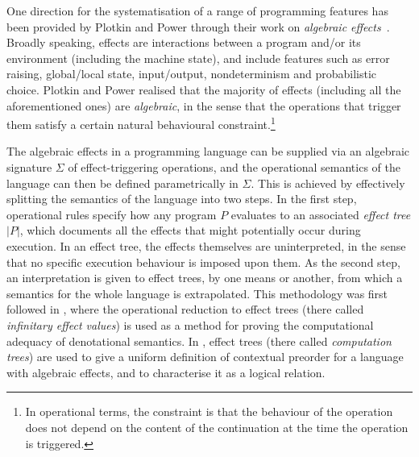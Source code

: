 One direction for the systematisation of a range of programming features has been provided by Plotkin and Power through their work on
 \emph{algebraic effects}~\cite{plotkin2001adequacy,PlotkinPower2002}. Broadly speaking, effects are interactions between a  program and/or its environment (including the machine state), and include features such as
 error raising, global/local state, input/output, nondeterminism and probabilistic choice. 
 Plotkin and Power realised that the majority of effects (including all the aforementioned ones) are \emph{algebraic}, in the sense that the operations that trigger them %
 satisfy a certain natural behavioural constraint.\footnote{In operational terms, the constraint  is that the behaviour of the operation does not depend on the content of the continuation at the time the operation is triggered.} 

The algebraic effects  in a programming language can  be supplied via an algebraic signature $\Sigma$ of effect-triggering operations,
and the operational semantics of the language can then be defined parametrically in $\Sigma$. 
This is achieved by effectively splitting the semantics of 
the language into two steps. In the first step, operational rules specify how any program $P$ evaluates 
to an associated \emph{effect tree} $|P|$, 
which documents  all the effects that might potentially occur during execution. %
In an effect tree, the effects themselves are uninterpreted, in the sense that no specific execution behaviour is imposed upon them. 
As the second step, an interpretation is given to effect trees, by one means or another, from which a semantics for the whole language is extrapolated.
This methodology was first followed in \cite{plotkin2001adequacy}, where the operational reduction to effect trees (there called \emph{infinitary effect values}) is used as a method for proving the computational adequacy of denotational semantics. 
In \cite{gom}, effect trees (there called \emph{computation trees}) are used to give a uniform definition of 
contextual preorder for a language with algebraic effects, and to characterise it as a logical relation.

